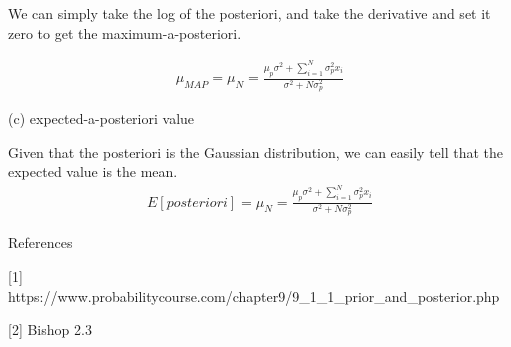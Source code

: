 \documentclass[11pt]{article}
\theoremstyle{definition}
\begin{document}
We can simply take the log of the posteriori, and take the derivative and set it zero to get the maximum-a-posteriori.


\begin{eqnarray}
\mu_{MAP} = \mu_N = \frac{\mu_p\sigma^2 + \sum_{i=1}^{N} \sigma_p^2x_i}{\sigma^2 + N\sigma_p^2} \nonumber
\end{eqnarray}

(c) expected-a-posteriori value

Given that the posteriori is the Gaussian distribution, we can easily tell that the expected value is the mean. 
\begin{eqnarray}
E[posteriori] = \mu_N = \frac{\mu_p\sigma^2 + \sum_{i=1}^{N} \sigma_p^2x_i}{\sigma^2 + N\sigma_p^2} \nonumber
\end{eqnarray}

References

[1] https://www.probabilitycourse.com/chapter9/9_1_1_prior_and_posterior.php

[2] Bishop 2.3
\end{document}
